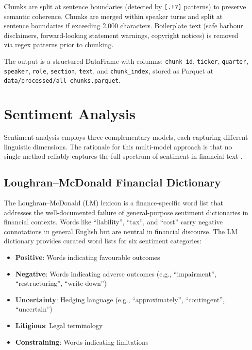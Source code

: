 \documentclass[12pt,a4paper]{article}
\begin{document}
Chunks are split at sentence boundaries (detected by \texttt{[.!?]} patterns) to preserve semantic coherence. Chunks are merged within speaker turns and split at sentence boundaries if exceeding 2,000 characters. Boilerplate text (safe harbour disclaimers, forward-looking statement warnings, copyright notices) is removed via regex patterns prior to chunking.

The output is a structured DataFrame with columns: \texttt{chunk\_id}, \texttt{ticker}, \texttt{quarter}, \texttt{speaker}, \texttt{role}, \texttt{section}, \texttt{text}, and \texttt{chunk\_index}, stored as Parquet at \texttt{data/processed/all\_chunks.parquet}.


\section{Sentiment Analysis}
\label{sec:sentiment}

Sentiment analysis employs three complementary models, each capturing different linguistic dimensions. The rationale for this multi-model approach is that no single method reliably captures the full spectrum of sentiment in financial text \citep{loughran2011liability, hutto2014vader}.

\subsection{Loughran--McDonald Financial Dictionary}

The Loughran--McDonald (LM) lexicon \citep{loughran2011liability} is a finance-specific word list that addresses the well-documented failure of general-purpose sentiment dictionaries in financial contexts. Words like ``liability'', ``tax'', and ``cost'' carry negative connotations in general English but are neutral in financial discourse. The LM dictionary provides curated word lists for six sentiment categories:

\begin{itemize}[noitemsep]
    \item \textbf{Positive}: Words indicating favourable outcomes
    \item \textbf{Negative}: Words indicating adverse outcomes (e.g., ``impairment'', ``restructuring'', ``write-down'')
    \item \textbf{Uncertainty}: Hedging language (e.g., ``approximately'', ``contingent'', ``uncertain'')
    \item \textbf{Litigious}: Legal terminology
    \item \textbf{Constraining}: Words indicating limitations
\end{itemize}
\end{document}
